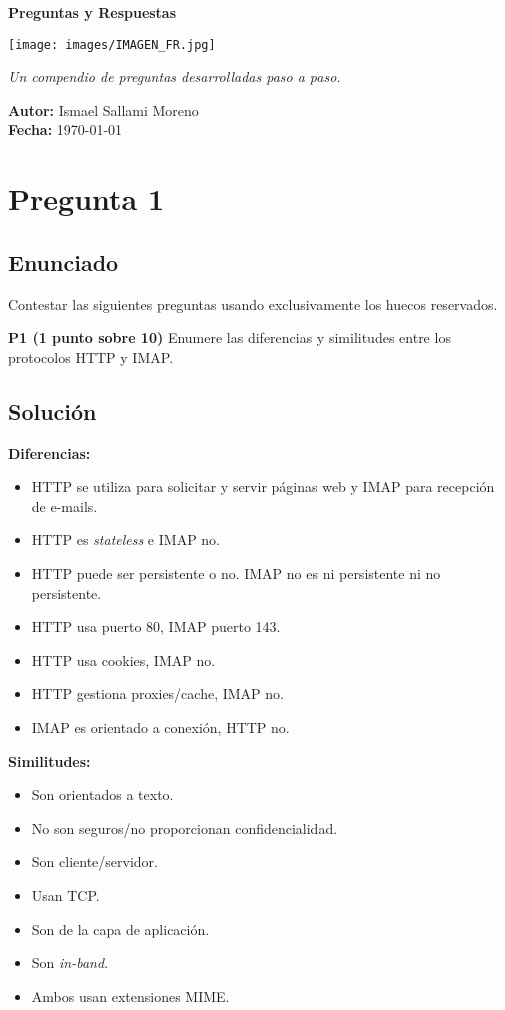 \documentclass[12pt]{article}
\newcommand{\makecover}{
    \begin{titlepage}
        \centering
        {\Huge\bfseries\sffamily\color{blue!70!black} Preguntas y Respuestas}\par
        \vspace{2cm}
        \texttt{[image: images/IMAGEN\_FR.jpg]}\par
        \vspace{2cm}
        \large \textit{Un compendio de preguntas desarrolladas paso a paso.}\par
        \vfill
        \textbf{Autor:} Ismael Sallami Moreno\\
        \textbf{Fecha:} \today
        \vspace{1cm}
    \end{titlepage}
}
\begin{document}
\makecover

\tableofcontents
\newpage

\section{Pregunta 1}

\subsection{Enunciado}

Contestar las siguientes preguntas usando exclusivamente los huecos reservados.

\textbf{P1 (1 punto sobre 10)} Enumere las diferencias y similitudes entre los protocolos HTTP y IMAP.

\subsection{Solución}

\textbf{Diferencias:}
\begin{itemize}
    \item HTTP se utiliza para solicitar y servir páginas web y IMAP para recepción de e-mails.
    \item HTTP es \textit{stateless} e IMAP no.
    \item HTTP puede ser persistente o no. IMAP no es ni persistente ni no persistente.
    \item HTTP usa puerto 80, IMAP puerto 143.
    \item HTTP usa cookies, IMAP no.
    \item HTTP gestiona proxies/cache, IMAP no.
    \item IMAP es orientado a conexión, HTTP no.
\end{itemize}

\textbf{Similitudes:}
\begin{itemize}
    \item Son orientados a texto.
    \item No son seguros/no proporcionan confidencialidad.
    \item Son cliente/servidor.
    \item Usan TCP.
    \item Son de la capa de aplicación.
    \item Son \textit{in-band}.
    \item Ambos usan extensiones MIME.
\end{itemize}
\end{document}

